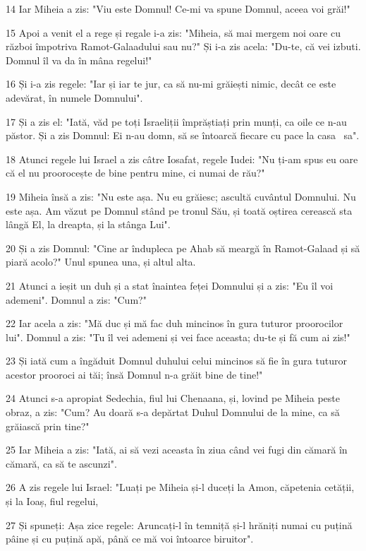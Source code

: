 \par 14 Iar Miheia a zis: "Viu este Domnul! Ce-mi va spune Domnul, aceea voi grăi!"
\par 15 Apoi a venit el a rege și regale i-a zis: "Miheia, să mai mergem noi oare cu război împotriva Ramot-Galaadului sau nu?" Și i-a zis acela: "Du-te, că vei izbuti. Domnul îl va da în mâna regelui!"
\par 16 Și i-a zis regele: "Iar și iar te jur, ca să nu-mi grăiești nimic, decât ce este adevărat, în numele Domnului".
\par 17 Și a zis el: "Iată, văd pe toți Israeliții împrăștiați prin munți, ca oile ce n-au păstor. Și a zis Domnul: Ei n-au domn, să se întoarcă fiecare cu pace la casa  sa".
\par 18 Atunci regele lui Israel a zis câtre Iosafat, regele Iudei: "Nu ți-am spus eu oare că el nu proorocește de bine pentru mine, ci numai de rău?"
\par 19 Miheia însă a zis: "Nu este așa. Nu eu grăiesc; ascultă cuvântul Domnului. Nu este așa. Am văzut pe Domnul stând pe tronul Său, și toată oștirea cerească sta lângă El, la dreapta, și la stânga Lui".
\par 20 Și a zis Domnul: "Cine ar îndupleca pe Ahab să meargă în Ramot-Galaad și să piară acolo?" Unul spunea una, și altul alta.
\par 21 Atunci a ieșit un duh și a stat înaintea feței Domnului și a zis: "Eu îl voi ademeni". Domnul a zis: "Cum?"
\par 22 Iar acela a zis: "Mă duc și mă fac duh mincinos în gura tuturor proorocilor lui". Domnul a zis: "Tu îl vei ademeni și vei face aceasta; du-te și fă cum ai zis!"
\par 23 Și iată cum a îngăduit Domnul duhului celui mincinos să fie în gura tuturor acestor prooroci ai tăi; însă Domnul n-a grăit bine de tine!"
\par 24 Atunci s-a apropiat Sedechia, fiul lui Chenaana, și, lovind pe Miheia peste obraz, a zis: "Cum? Au doară s-a depărtat Duhul Domnului de la mine, ca să grăiască prin tine?"
\par 25 Iar Miheia a zis: "Iată, ai să vezi aceasta în ziua când vei fugi din cămară în cămară, ca să te ascunzi".
\par 26 A zis regele lui Israel: "Luați pe Miheia și-l duceți la Amon, căpetenia cetății, și la Ioaș, fiul regelui,
\par 27 Și spuneți: Așa zice regele: Aruncați-l în temniță și-l hrăniți numai cu puțină pâine și cu puțină apă, până ce mă voi întoarce biruitor".
